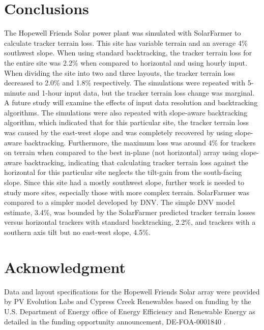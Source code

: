 \documentclass[conference]{IEEEtran}
\begin{document}
\section{Conclusions}
The Hopewell Friends Solar power plant was simulated with SolarFarmer to calculate tracker terrain loss. This site has variable terrain and an average 4\% southwest slope. When using standard backtracking, the tracker terrain loss for the entire site was 2.2\% when compared to horizontal and using hourly input. When dividing the site into two and three layouts, the tracker terrain loss decreased to 2.0\% and 1.8\% respectively. The simulations were repeated with 5-minute and 1-hour input data, but the tracker terrain loss change was marginal. A future study will examine the effects of input data resolution and backtracking algorithms. The simulations were also repeated with slope-aware backtracking algorithm, which indicated that for this particular site, the tracker terrain loss was caused by the east-west slope and was completely recovered by using slope-aware backtracking. Furthermore, the maximum loss was around 4\% for trackers on terrain when compared to the best in-plane (not horizontal) array using slope-aware backtracking, indicating that calculating tracker terrain loss against the horizontal for this particular site neglects the tilt-gain from the south-facing slope. Since this site had a mostly southwest slope, further work is needed to study more sites, especially those with more complex terrain. SolarFarmer was compared to a simpler model developed by DNV. The simple DNV model estimate, 3.4\%, was bounded by the SolarFarmer predicted tracker terrain losses versus horizontal trackers with standard backtracking, 2.2\%, and trackers with a southern axis tilt but no east-west slope, 4.5\%. %

\section*{Acknowledgment}

Data and layout specifications for the Hopewell Friends Solar array were provided by PV Evolution Labs and Cypress Creek Renewables based on funding by the U.S. Department of Energy office of Energy Efficiency and Renewable Energy as detailed in the funding opportunity announcement, DE-FOA-0001840 \cite{CypressCreekRenewables2019}.



\end{document}
